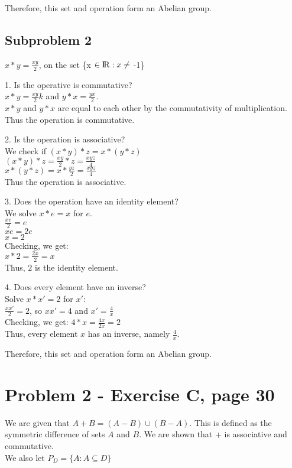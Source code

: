 \documentclass[12pt]{article}
\begin{document}
Therefore, this set and operation form an Abelian group.

\subsection{Subproblem 2}
\begin{center}
$x * y = \frac{xy}{2}$, on the set \{x $\in {\rm I\!R} :x \neq$ -1\}
\end{center}
1. Is the operative is commutative?\\
$x*y=\frac{xy}{2}k$ and $y*x=\frac{yx}{2}$. 
\\$x*y$ and $y*x$ are equal to each other by the commutativity of multiplication.
\\Thus the operation is commutative.

2. Is the operation is associative?\\
We check if $(x*y)*z=x*(y*z)$\\
$(x*y)*z=\frac{xy}{2}*z=\frac{xyz}{4}$\\
$x*(y*z)=x*\frac{yz}{2}=\frac{xyz}{4}$\\
Thus the operation is associative.

3. Does the operation have an identity element?\\
We solve $x*e=x$ for $e$.\\
$\frac{xe}{2}=e$\\$xe=2e$\\$x=2$\\
Checking, we get:\\
$x*2=\frac{2x}{2}=x$\\
Thus, $2$ is the identity element.

4. Does every element have an inverse?\\
Solve $x*x'=2$ for $x'$:\\
$\frac{xx'}{2}=2$, so $xx'=4$ and $x'=\frac{4}{x}$\\
Checking, we get:
$4*x=\frac{4x}{2x}=2$\\
Thus, every element $x$ has an inverse, namely $\frac{4}{x}$.

Therefore, this set and operation form an Abelian group.

\section{Problem 2 - Exercise C, page 30}
We are given that $A+B=(A-B)\cup(B-A)$. This is defined as the symmetric difference of sets $A$ and $B$. We are shown that + is associative and commutative.\\
We also let $P_D=\{A:A\subseteq D\}$
\end{document}
